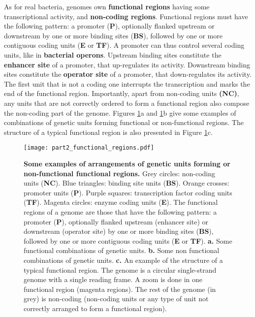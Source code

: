 As for real bacteria, {\EvoEvoSim} genomes own \textbf{functional regions} having some transcriptional activity, and \textbf{non-coding regions}. Functional regions must have the following pattern: a promoter (\textbf{P}), optionally flanked upstream or downstream by one or more binding sites (\textbf{BS}), followed by one or more contiguous coding units (\textbf{E} or \textbf{TF}). A promoter can thus control several coding units, like in \textbf{bacterial operons}. Upstream binding sites constitute the \textbf{enhancer site} of a promoter, that up-regulates its activity. Downstream binding sites constitute the \textbf{operator site} of a promoter, that down-regulates its activity. The first unit that is not a coding one interrupts the transcription and marks the end of the functional region. Importantly, apart from non-coding units \textbf{(NC)}, any units that are not correctly ordered to form a functional region also compose the non-coding part of the genome. Figures \ref{fig:part2:methodology:functional_regions}a and \ref{fig:part2:methodology:functional_regions}b give some examples of combinations of genetic units forming functional or non-functional regions. The structure of a typical functional region is also presented in Figure \ref{fig:part2:methodology:functional_regions}c.



\begin{figure}[!h]
\centering
\texttt{[image: part2\_functional\_regions.pdf]}
\caption[Some examples of arrangements of genetic units forming functional or non-functional regions.]{\textbf{Some examples of arrangements of genetic units forming or non-functional functional regions.} Grey circles: non-coding units (\textbf{NC}). Blue triangles: binding site units (\textbf{BS}). Orange crosses: promoter units (\textbf{P}). Purple squares: transcription factor coding units (\textbf{TF}). Magenta circles: enzyme coding units (\textbf{E}). The functional regions of a genome are those that have the following pattern: a promoter (\textbf{P}), optionally flanked upstream (enhancer site) or downstream (operator site) by one or more binding sites (\textbf{BS}), followed by one or more contiguous coding units (\textbf{E} or \textbf{TF}). \textbf{a.} Some functional combinations of genetic units. \textbf{b.} Some non functional combinations of genetic units. \textbf{c.} An example of the structure of a typical functional region. The genome is a circular single-strand genome with a single reading frame. A zoom is done in one functional region (magenta regions). The rest of the genome (in grey) is non-coding (non-coding units or any type of unit not correctly arranged to form a functional region).}
\label{fig:part2:methodology:functional_regions}
\end{figure}

